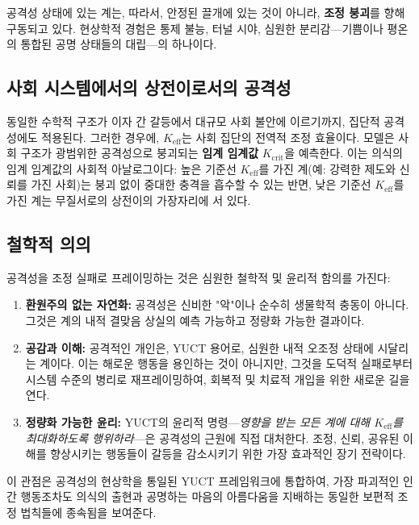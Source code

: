 \documentclass[12pt,a4paper]{article}
\begin{document}
	공격성 상태에 있는 계는, 따라서, 안정된 끌개에 있는 것이 아니라, \textbf{조정 붕괴}를 향해 구동되고 있다. 현상학적 경험은 통제 불능, 터널 시야, 심원한 분리감—기쁨이나 평온의 통합된 공명 상태들의 대립—의 하나이다.
	
	\subsection{사회 시스템에서의 상전이로서의 공격성}
	
	동일한 수학적 구조가 이자 간 갈등에서 대규모 사회 불안에 이르기까지, 집단적 공격성에도 적용된다. 그러한 경우에, \(K_{\mathrm{eff}}\)는 사회 집단의 전역적 조정 효율이다. 모델은 사회 구조가 광범위한 공격성으로 붕괴되는 \textbf{임계 임계값} \(K_{\mathrm{crit}}\)을 예측한다. 이는 의식의 임계 임계값의 사회적 아날로그이다: 높은 기준선 \(K_{\mathrm{eff}}\)를 가진 계(예: 강력한 제도와 신뢰를 가진 사회)는 붕괴 없이 중대한 충격을 흡수할 수 있는 반면, 낮은 기준선 \(K_{\mathrm{eff}}\)를 가진 계는 무질서로의 상전이의 가장자리에 서 있다.
	
	\subsection{철학적 의의}
	
	공격성을 조정 실패로 프레이밍하는 것은 심원한 철학적 및 윤리적 함의를 가진다:
	
	\begin{enumerate}
		\item \textbf{환원주의 없는 자연화:} 공격성은 신비한 "악"이나 순수히 생물학적 충동이 아니다. 그것은 계의 내적 결맞음 상실의 예측 가능하고 정량화 가능한 결과이다.
		\item \textbf{공감과 이해:} 공격적인 개인은, YUCT 용어로, 심원한 내적 오조정 상태에 시달리는 계이다. 이는 해로운 행동을 용인하는 것이 아니지만, 그것을 도덕적 실패로부터 시스템 수준의 병리로 재프레이밍하여, 회복적 및 치료적 개입을 위한 새로운 길을 연다.
		\item \textbf{정량화 가능한 윤리:} YUCT의 윤리적 명령—\textit{영향을 받는 모든 계에 대해 \(K_{\mathrm{eff}}\)를 최대화하도록 행위하라}—은 공격성의 근원에 직접 대처한다. 조정, 신뢰, 공유된 이해를 향상시키는 행동들이 갈등을 감소시키기 위한 가장 효과적인 장기 전략이다.
	\end{enumerate}
	
	이 관점은 공격성의 현상학을 통일된 YUCT 프레임워크에 통합하여, 가장 파괴적인 인간 행동조차도 의식의 출현과 공명하는 마음의 아름다움을 지배하는 동일한 보편적 조정 법칙들에 종속됨을 보여준다.
	
\end{document}
